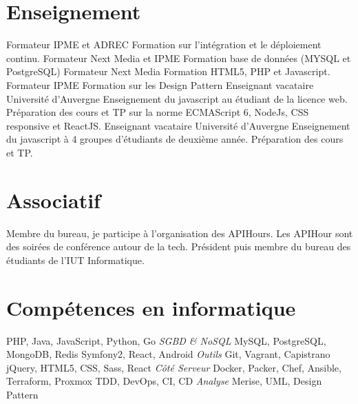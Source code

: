 \documentclass[11pt,a4paper]{moderncv}
\begin{document}
    \section{Enseignement}
        {Formateur}
        {IPME et ADREC}
        {}
        {}
        {
          Formation sur l'intégration et le déploiement continu.
        }
        {Formateur}
        {Next Media et IPME}
        {}
        {}
        {
          Formation base de données (MYSQL et PostgreSQL)
        }
        {Formateur}
        {Next Media}
        {}
        {}
        {
          Formation HTML5, PHP et Javascript.
        }
        {Formateur}
        {IPME}
        {}
        {}
        {
            Formation sur les Design Pattern
        }
        {Enseignant vacataire}
        {Université d'Auvergne}
        {}
        {}
        {
          Enseignement du javascript au étudiant de la licence web.\newline{}
          Préparation des cours et TP sur la norme ECMAScript 6, NodeJs, CSS
          responsive et ReactJS.
        }
        {Enseignant vacataire}
        {Université d'Auvergne}
        {}
        {}
        {
          Enseignement du javascript à 4 groupes d'étudiants de deuxième année.\newline{}
          Préparation des cours et TP.
        }
\pagebreak
    \section{Associatif}
        {
          Membre du bureau, je participe à l'organisation des APIHours. Les
          APIHour sont \newline{}des soirées de conférence autour de la tech.
        }
        {
          Président puis membre du bureau des étudiants de l'IUT Informatique.
        }

    \section{Compétences en informatique}
         {PHP, Java, JavaScript, Python, Go}
            {\textit{SGBD \& NoSQL}} {MySQL, PostgreSQL, MongoDB, Redis}
         {Symfony2, React, Android }
            {\textit{Outils}} {Git, Vagrant, Capistrano}
         {jQuery, HTML5, CSS, Sass, React}
            {\textit{Côté Serveur}} {Docker, Packer, Chef, Ansible, Terraform, Proxmox}
         {TDD, DevOps, CI, CD}
            {\textit{Analyse}} {Merise, UML, Design Pattern}
\end{document}
